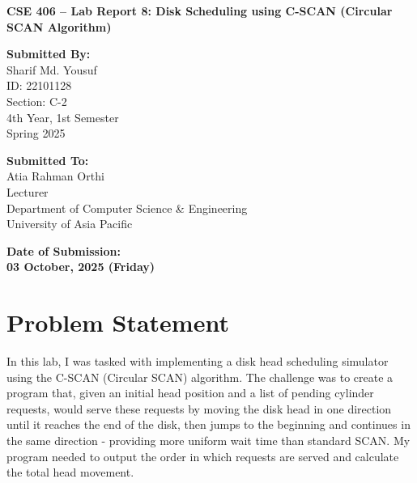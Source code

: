 \documentclass[12pt,a4paper]{article}
\begin{document}
\begin{titlepage}
  \centering
  \vspace*{3cm}

  {\Huge\bfseries CSE 406 – Lab Report 8: Disk Scheduling using C-SCAN (Circular SCAN Algorithm) \par}
  \vspace{2.5cm}

  \noindent
  \begin{minipage}[t]{0.48\textwidth}
    {\large\bfseries Submitted By:}\\[0.5em]
    \Large
    Sharif Md. Yousuf \\
    ID: 22101128 \\
    Section: C-2 \\
    4th Year, 1st Semester \\
    Spring 2025
  \end{minipage}
  \hfill
  \begin{minipage}[t]{0.48\textwidth}
    {\large\bfseries Submitted To:}\\[0.5em]
    \Large
    Atia Rahman Orthi \\
    Lecturer \\
    Department of Computer Science \& Engineering \\
    University of Asia Pacific
  \end{minipage}

  \vfill

  {\Large\bfseries Date of Submission:} \\[0.5em]
  {\LARGE\bfseries 03 October, 2025 (Friday)}

  \vspace*{2cm}
\end{titlepage}

\section{Problem Statement}
In this lab, I was tasked with implementing a disk head scheduling simulator using the C-SCAN (Circular SCAN) algorithm. The challenge was to create a program that, given an initial head position and a list of pending cylinder requests, would serve these requests by moving the disk head in one direction until it reaches the end of the disk, then jumps to the beginning and continues in the same direction - providing more uniform wait time than standard SCAN. My program needed to output the order in which requests are served and calculate the total head movement.
\end{document}
